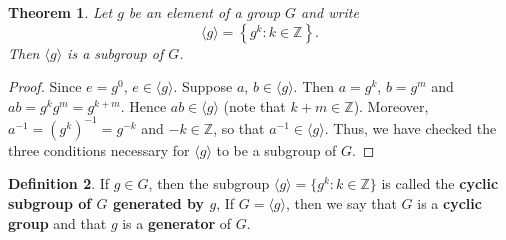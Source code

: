 \documentclass[12pt]{article}
\newcommand{\Z} {{\mathbb Z}}
\newcommand{\set}[1]{\left\{#1\right\}}
\newcommand{\<}{\ensuremath{\langle}}
\renewcommand{\>}{\ensuremath{\rangle}}
\newcommand{\eye}{\ensuremath{e}}
\theoremstyle{plain}
\newtheorem{thm}{Theorem}%
\theoremstyle{definition}
\newtheorem{defn}[thm]{Definition}
\begin{document}
\begin{thm}
  Let $g$ be an element of a group $G$ and write
$$\langle g\rangle = \set{g^k: k\in \Z}.$$
Then $\langle g\rangle$ is a subgroup of $G$.
\end{thm}
\begin{proof}  Since $\eye=g^0$, $\eye\in \langle g\rangle$.  Suppose $a$,
$b\in \langle g\rangle$.  Then $a=g^k$, $b=g^m$ and
$ab=g^kg^m=g^{k+m}$. Hence $ab\in \langle g\rangle$ (note that
$k+m\in \Z$).  Moreover, $a^{-1} = (g^k)^{-1} = g^{-k}$ and $-k\in
\Z$, so that $a^{-1}\in \langle g\rangle$.  Thus, we have checked
the three conditions necessary for $\langle g\rangle$ to be a
subgroup of $G$.
\end{proof}
\begin{defn}  If $g\in G$, then the subgroup $\langle g\rangle = \{g^k:
k\in \Z\}$ is called the {\bf cyclic subgroup of $G$ generated by
$g$}, If $G=\langle g\rangle$, then we say that $G$ is a {\bf
cyclic group} and that $g$ is a {\bf generator} of $G$.
\end{defn}
\end{document}
